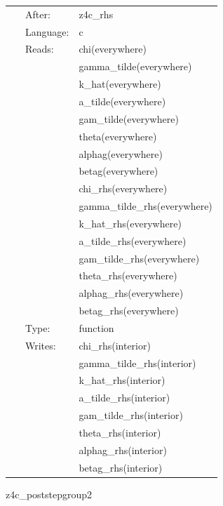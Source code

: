 \hspace{5mm}

 \begin{tabular*}{160mm}{cll} 
~ & After:  & z4c\_rhs \\ 
~ & Language:  & c \\ 
~ & Reads:  & chi(everywhere) \\ 
~& ~ &gamma\_tilde(everywhere)\\ 
~& ~ &k\_hat(everywhere)\\ 
~& ~ &a\_tilde(everywhere)\\ 
~& ~ &gam\_tilde(everywhere)\\ 
~& ~ &theta(everywhere)\\ 
~& ~ &alphag(everywhere)\\ 
~& ~ &betag(everywhere)\\ 
~& ~ &chi\_rhs(everywhere)\\ 
~& ~ &gamma\_tilde\_rhs(everywhere)\\ 
~& ~ &k\_hat\_rhs(everywhere)\\ 
~& ~ &a\_tilde\_rhs(everywhere)\\ 
~& ~ &gam\_tilde\_rhs(everywhere)\\ 
~& ~ &theta\_rhs(everywhere)\\ 
~& ~ &alphag\_rhs(everywhere)\\ 
~& ~ &betag\_rhs(everywhere)\\ 
~ & Type:  & function \\ 
~ & Writes:  & chi\_rhs(interior) \\ 
~& ~ &gamma\_tilde\_rhs(interior)\\ 
~& ~ &k\_hat\_rhs(interior)\\ 
~& ~ &a\_tilde\_rhs(interior)\\ 
~& ~ &gam\_tilde\_rhs(interior)\\ 
~& ~ &theta\_rhs(interior)\\ 
~& ~ &alphag\_rhs(interior)\\ 
~& ~ &betag\_rhs(interior)\\ 
\end{tabular*} 


\vspace{5mm}


\hspace{5mm} z4c\_poststepgroup2 

\hspace{5mm}{\it post-process z4c variables, part 2 } 


